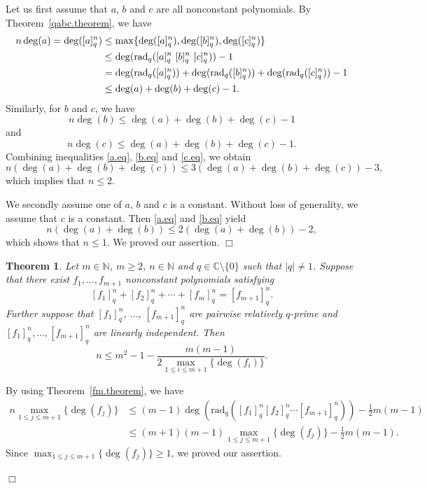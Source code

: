 \documentclass[a4paper,12pt]{article}
\newcommand{\C}{\mathbb{C}}
\newcommand{\N}{\mathbb{N}}
\newtheorem{theorem}[defin]{Theorem}
\newenvironment{proof}
{\noindent{\it Proof.}}{\hfill $\Box$\par\vspace{2.5mm}}
\numberwithin{equation}{section}
\begin{document}
\begin{proof}
Let us first assume that $a$, $b$ and $c$ are all nonconstant polynomials.
By Theorem~\ref{qabc.theorem}, we have
    \begin{equation}\label{a.eq}
    \begin{split}
    n\deg(a)=\deg([a]_q^n)&\leq\max\{ \deg([a]_q^n), \deg([b]_q^n),\deg([c]_q^n)\}\\
    &\leq \deg({\rm rad}_q([a]_q^n~[b]_q^n~[c]_q^n))-1\\
    &=\deg({\rm rad}_q([a]_q^n))+
    \deg({\rm rad}_q([b]_q^n))+
    \deg({\rm rad}_q([c]_q^n))-1\\
    &\leq \deg(a)+\deg(b)+\deg(c)-1.
    \end{split}
    \end{equation}
Similarly, for $b$ and $c$, we have
    \begin{equation}\label{b.eq}
    n\deg(b)\leq \deg(a)+\deg(b)+\deg(c)-1
    \end{equation}
and
    \begin{equation}\label{c.eq}
    n\deg(c)\leq \deg(a)+\deg(b)+\deg(c)-1.
    \end{equation}
Combining inequalities \eqref{a.eq}, \eqref{b.eq} and \eqref{c.eq}, we obtain
    $$
    n(\deg(a)+\deg(b)+\deg(c))\leq 3(\deg(a)+\deg(b)+\deg(c))-3,
    $$
which implies that $n\leq 2$.

We secondly assume one of $a$, $b$ and $c$ is a constant. Without loss of generality, we assume that $c$ is a constant. Then \eqref{a.eq} and \eqref{b.eq} yield
    $$
    n(\deg(a)+\deg(b))\leq 2(\deg(a)+\deg(b))-2,
    $$
which shows that $n\leq 1$. We proved our assertion.
\end{proof}

\begin{theorem}\label{Equn.eq}
Let $m\in \N$, $m\geq 2$, $n\in\N$ and $q\in\C\setminus\{0\}$ such that $|q|\neq 1$. Suppose that there exist $f_1,\ldots,f_{m+1}$ nonconstant polynomials satisfying
    $$
    [f_1]_q^n+[f_2]_q^n+\cdots
    +[f_m]_q^n=[f_{m+1}]_q^n.
    $$
Further suppose  that $[f_1]_q^n$, $\ldots$, $[f_{m+1}]_q^n$ are pairwise relatively $q$-prime and $[f_1]_q^n,\ldots,[f_{m+1}]_q^n$ are linearly independent.
Then
$$
n\leq m^2-1-\frac{m(m-1)}{2\max_{1\leq i\leq m+1}\{\deg(f_i)\}}.
$$
\end{theorem}

\begin{proof}
By using Theorem~\ref{fm.theorem}, we have
    \begin{equation*}
    \begin{split}
    n \max_{1\leq j\leq m+1}\{\deg(f_j)\}
    &\leq (m-1)\deg\left(\text{rad}_q\left([f_1]_q^n[f_2]_q^n\cdots [f_{m+1}]_q^n\right)\right)-\frac12m(m-1)\\
    &\leq (m+1)(m-1)\max_{1\leq j\leq m+1}\{\deg(f_j)\}-\frac12m(m-1).
    \end{split}
    \end{equation*}
Since $\max_{1\leq j\leq m+1}\{\deg(f_j)\}\geq 1$, we proved our assertion.

\end{proof}
\end{document}
